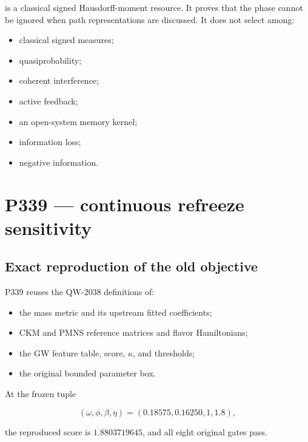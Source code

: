 \documentclass[11pt,a4paper,openany]{report}
\begin{document}
is a classical signed Hausdorff-moment resource. It proves that the phase cannot be ignored when path representations are discussed. It does not select among:

\begin{itemize}
\item 
classical signed measures;

\item 
quasiprobability;

\item 
coherent interference;

\item 
active feedback;

\item 
an open-system memory kernel;

\item 
information loss;

\item 
negative information.

\end{itemize}

\chapter{P339 --- continuous refreeze sensitivity}

\section{Exact reproduction of the old objective}

P339 reuses the QW-2038 definitions of:

\begin{itemize}
\item 
the mass metric and its upstream fitted coefficients;

\item 
CKM and PMNS reference matrices and flavor Hamiltonians;

\item 
the GW feature table, score, \(\kappa\), and thresholds;

\item 
the original bounded parameter box.

\end{itemize}

At the frozen tuple

\[
(\omega,\phi,\beta,\eta)
=(0.18575,0.16250,1,1.8),
\]

the reproduced score is \(1.8803719645\), and all eight original gates pass.
\end{document}
